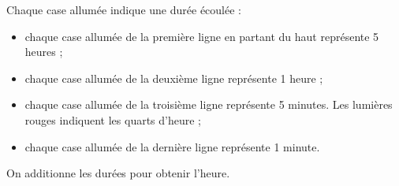    Chaque case allumée indique une durée écoulée :
   \begin{itemize}
      \item chaque case allumée de la première ligne en partant du haut représente 5 heures ;
      \item chaque case allumée de la deuxième ligne représente 1 heure ;
      \item chaque case allumée de la troisième ligne représente 5 minutes. Les lumières rouges indiquent les quarts d’heure ;
      \item chaque case allumée de la dernière ligne représente 1 minute.
   \end{itemize}
  On additionne les durées pour obtenir l'heure.
